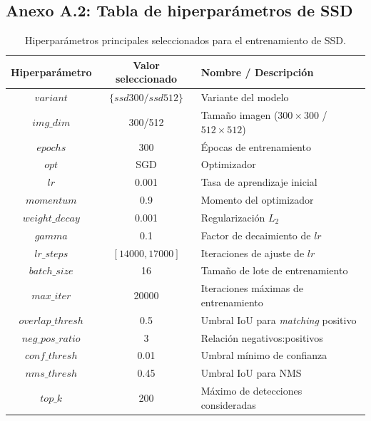 \subsection*{Anexo A.2: Tabla de hiperparámetros de SSD}

\begin{table}[H]
    \centering
    \caption{Hiperparámetros principales seleccionados para el entrenamiento de SSD.}
    \begin{tabular}{|c|c|l|}
        \hline
        \textbf{Hiperparámetro} & \textbf{Valor seleccionado} & \textbf{Nombre / Descripción} \\
        \hline
        $variant$ & $\{ssd300/ssd512\}$ & Variante del modelo \\
        \hline
        $img\_dim$ & 300/512 & Tamaño imagen ($300\times300$ / $512\times512$) \\
        \hline
        $epochs$ & 300 & Épocas de entrenamiento \\
        \hline
        $opt$ & SGD & Optimizador \\
        \hline
        $lr$ & 0.001 & Tasa de aprendizaje inicial \\
        \hline
        $momentum$ & 0.9 & Momento del optimizador \\
        \hline
        $weight\_decay$ & 0.001 & Regularización $L_2$ \\
        \hline
        $gamma$ & 0.1 & Factor de decaimiento de $lr$ \\
        \hline
        $lr\_steps$ & $[14000, 17000]$ & Iteraciones de ajuste de $lr$ \\
        \hline
        $batch\_size$ & 16 & Tamaño de lote de entrenamiento \\
        \hline
        $max\_iter$ & 20000 & Iteraciones máximas de entrenamiento \\
        \hline
        $overlap\_thresh$ & 0.5 & Umbral IoU para \textit{matching} positivo \\
        \hline
        $neg\_pos\_ratio$ & 3 & Relación negativos:positivos \\
        \hline
        $conf\_thresh$ & 0.01 & Umbral mínimo de confianza \\
        \hline
        $nms\_thresh$ & 0.45 & Umbral IoU para NMS \\
        \hline
        $top\_k$ & 200 & Máximo de detecciones consideradas \\

\end{tabular}
\end{table}
